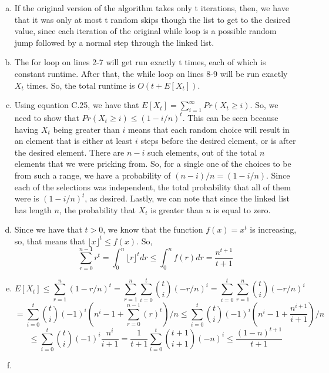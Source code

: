 \documentclass{article}
\begin{document}
\begin{enumerate}[a.]
\item
If the original version of the algorithm takes only t iterations, then, we have that it was only at most t random skips though the list to get to the desired value, since each iteration of the original while loop is a possible random jump followed by a normal step through the linked list.

\item
The for loop on lines 2-7 will get run exactly t times, each of which is constant runtime. After that, the while loop on lines 8-9 will be run exactly $X_t$ times. So, the total runtime is $O(t+E[X_t])$.

\item

Using equation C.25, we have that $E[X_t] = \sum_{i=1}^{\infty} Pr(X_t\ge i)$. So, we need to show that $ Pr(X_t\ge i) \le (1-i/n)^t$. This can be seen because having $X_t$ being greater than $i$ means that each random choice will result in an element that is either at least $i$ steps before the desired element, or is after the desired element. There are $n-i$ such elements, out of the total $n$ elements that we were pricking from. So, for a single one of the choices to be from such a range, we have a probability of $(n-i)/n = (1-i/n)$. Since each of the selections was independent, the total probability that all of them were is $(1-i/n)^t$, as desired. Lastly, we can note that since the linked list has length $n$, the probability that $X_t$ is greater than $n$ is equal to zero.

\item

Since we have that $t>0$, we know that the function $f(x) = x^t$ is increasing, so, that means that $\lfloor x \rfloor ^t \le f(x)$. So,
\[
\sum_{r=0}^{n-1} r^t  = \int_{0}^n \lfloor r \rfloor^t dr \le \int_0^n f(r) dr = \frac{n^{t+1}}{t+1}
\]

\item

\[
E[X_t] \le \sum_{r=1}^n (1-r/n)^t = \sum_{r=1}^n \sum_{i=0}^t \binom{t}{i} (-r/n)^i = \sum_{i=0}^t \sum_{r=1}^n  \binom{t}{i} (-r/n)^i \]\[
= \sum_{i=0}^t  \binom{t}{i} (-1)^i\left(n^i -1+ \sum_{r=0}^{n-1} (r)^t\right)/n \le \sum_{i=0}^t  \binom{t}{i} (-1)^i\left( n^i-1+ \frac{n^{i+1}}{i+1}\right)/n 
\]
\[
\le  \sum_{i=0}^t  \binom{t}{i} (-1)^i \frac{n^i}{i+1} =  \frac{1}{t+1} \sum_{i=0}^t \binom{t+1}{i+1} (-n)^i \le \frac{(1-n)^{t+1}}{t+1}
\]

\item


\end{enumerate}
\end{document}
